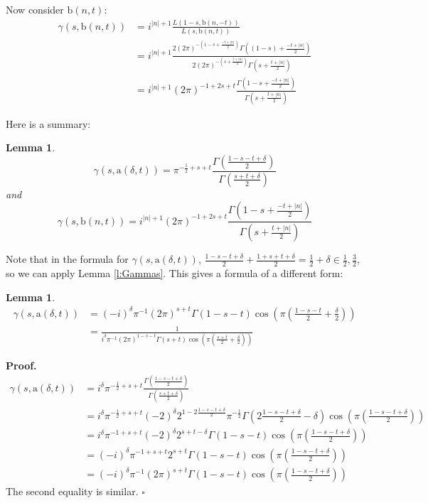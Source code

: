 \documentclass[10pt,leqno]{article}
\newtheorem{lemma}[equation]{Lemma}
\newcommand{\qed}{\hfill $\square$ \medskip}
\newenvironment{proof}[1][Proof]{\noindent\textbf{#1.} }{\qed}
\renewcommand{\b}{\mathfrak b}
\renewcommand{\a}{\mathfrak a}
\newcommand\inv{^{-1}}
\renewcommand{\a}{\mathrm a}
\renewcommand{\b}{\mathrm b}
\begin{document}
Now consider  $\b(n,t)$:
$$
\begin{aligned}
\gamma(s,\b(n,t))&=i^{|n|+1}\frac{L(1-s,\b(n,-t))}{L(s,\b(n,t))}\\
&=i^{|n|+1}
\frac{2(2\pi)^{-(1-s+\frac{-t+|n|}2)}\Gamma((1-s)+\frac{-t+|n|}2)}{
2(2\pi)^{-(s+\frac{t+|n|}2)}\Gamma(s+\frac{t+|n|}2)}\\
&=i^{|n|+1}(2\pi)^{-1+2s+t}
\frac{\Gamma(1-s+\frac{-t+|n|}2)}{\Gamma(s+\frac{t+|n|}2)}
\end{aligned}
$$

Here is a summary:
\begin{lemma}
  \label{l:gammas}
$$
  \gamma(s,\a(\delta,t))=\pi^{-\frac 12+s+t}\frac{\Gamma(\frac{1-s-t+\delta}2)}{\Gamma(\frac{s+t+\delta}2)}
$$
  and
  $$
  \gamma(s,\b(n,t))=i^{|n|+1}(2\pi)^{-1+2s+t}\frac{\Gamma(1-s+\frac{-t+|n|}2)}{\Gamma(s+\frac{t+|n|}2)}
  $$
\end{lemma}


Note that in the formula for $\gamma(s,\a(\delta,t))$,
$\frac{1-s-t+\delta}2+\frac{1+s+t+\delta}2=\frac12+\delta\in\frac12,\frac32$, so we can apply Lemma \ref{l:Gammas}.
This gives a formula of a different form:

\begin{lemma}
$$
\begin{aligned}
\gamma(s,\a(\delta,t))&=(-i)^\delta\pi\inv (2\pi)^{s+t}\Gamma(1-s-t)\cos(\pi(\frac{1-s-t}2+\frac\delta 2))\\
&=\frac1{i^\delta\pi\inv(2\pi)^{1-s-t}\Gamma(s+t)\cos(\pi(\frac{s+t}2+\frac\delta 2))}
\end{aligned}
$$
\end{lemma}


\begin{proof}
  $$
  \begin{aligned}
    \gamma(s,\a(\delta,t))&=i^\delta\pi^{-\frac 12+s+t}\frac{\Gamma(\frac{1-s-t+\delta}2)}{\Gamma(\frac{s+t+\delta}2)}\\
    &= i^\delta\pi^{-\frac 12+s+t}(-2)^\delta 2^{1-2\frac{1-s-t+\delta}2}\pi^{-\frac12}\Gamma(2\frac{1-s-t+\delta}2-\delta)\cos(\pi( \frac{1-s-t+\delta}2))\\
    &=    i^\delta\pi^{-1+s+t}(-2)^\delta2^{s+t-\delta}\Gamma(1-s-t)\cos(\pi( \frac{1-s-t+\delta}2))\\
    &=    (-i)^\delta\pi^{-1+s+t}2^{s+t}\Gamma(1-s-t)\cos(\pi( \frac{1-s-t+\delta}2))\\
        &=    (-i)^\delta\pi\inv(2\pi)^{s+t}\Gamma(1-s-t)\cos(\pi (\frac{1-s-t+\delta}2))
  \end{aligned}
  $$
  The second equality is similar. 
\end{proof}
\end{document}
